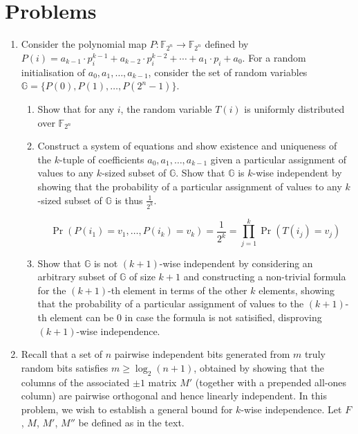 \section{Problems}
\begin{enumerate}
\item[\textbf{1}]
Consider the polynomial map $P : \mathbb F_{2^n} \to \mathbb F_{2^n}$ defined by 
$P(i)=a_{k-1}\cdot p_i^{k-1} + a_{k-2}\cdot p_i^{k-2} + \cdots + a_1\cdot p_i + a_0$. For a random initialisation 
of $a_0,a_1,\dots,a_{k-1}$, consider the set of random variables $\mathbb G= \{P(0),P(1),\dots,P(2^{n}-1)\}$.

\begin{enumerate}[label=\textbf{(\alph*)}]
\item Show that for any $i$, the random variable $T(i)$ is uniformly distributed over $\mathbb F_{2^n}$ 

\item Construct a system of equations and show existence and uniqueness of the $k$-tuple of coefficients 
$a_0,a_1,\dots,a_{k-1}$ given a particular assignment of values to any $k$-sized subset of 
$\mathbb G$. Show that $\mathbb G$ is $k$-wise independent by showing that the probability 
of a particular assignment of values to any $k$-sized subset of $\mathbb G$ is thus $\frac{1}{2^k}$.

\[
\Pr \left(P(i_1)=v_1,\dots,P(i_k)=v_k \right)
=
\frac{1}{2^k}
=
\prod_{j=1}^{k} \Pr \left(T(i_j)=v_j\right)
\]

\item Show that $\mathbb G$ is not $(k+1)$-wise independent by considering an arbitrary subset of $\mathbb G$ 
of size $k+1$ and constructing a non-trivial formula for the $(k+1)$-th element in terms of the other 
$k$ elements, showing that the probability of a particular assignment of values to the $(k+1)$-th element 
can be $0$ in case the formula is not satisified, disproving $(k+1)$-wise independence.

\end{enumerate}

\item[\textbf{2}]
Recall that a set of $n$ pairwise independent bits generated from $m$ 
truly random bits satisfies $m \geq \log_2(n+1)$, obtained by showing that the columns of 
the associated $\pm 1$ matrix $M'$ (together with a prepended all-ones column) are pairwise 
orthogonal and hence linearly independent. In this problem, we wish to establish a general bound 
for $k$-wise independence. Let $F$, $M$, $M'$, $M''$ be defined as in the text.\\


\end{enumerate}
